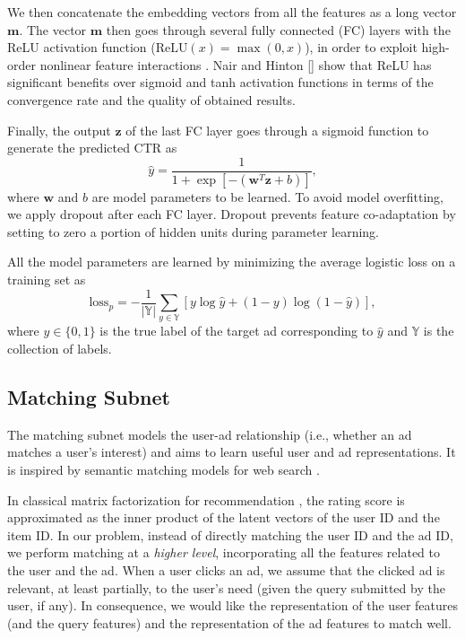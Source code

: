 \documentclass{article}
\begin{document}
We then concatenate the embedding vectors from all the features as a long vector $\mathbf{m}$.
The vector $\mathbf{m}$ then goes through several fully connected (FC) layers with the ReLU activation function ($\mathrm{ReLU}(x) = \max(0, x)$), in order to exploit high-order nonlinear feature interactions \cite{he2017neural}. Nair and Hinton [\citeyear{nair2010rectified}] show that ReLU has significant benefits over sigmoid and tanh activation functions in terms of the convergence rate and the quality of obtained results.

Finally, the output $\mathbf{z}$ of the last FC layer goes through a sigmoid function to generate the predicted CTR as
\[
\hat{y} = \frac{1}{1+\exp[- (\mathbf{w}^T \mathbf{z} + b)]},
\]
where $\mathbf{w}$ and $b$ are model parameters to be learned.
To avoid model overfitting, we apply dropout \cite{srivastava2014dropout} after each FC layer.
Dropout prevents feature co-adaptation by setting to zero a portion of hidden units during parameter learning.

All the model parameters are learned by minimizing the average logistic loss on a training set as
\begin{equation} \label{loss_p}
\mathrm{loss}_p = - \frac{1}{|\mathbb{Y}|}\sum_{y \in \mathbb{Y}} [y \log \hat{y} + (1 - y) \log (1 - \hat{y})],
\end{equation}
where $y \in\{0,1\}$ is the true label of the target ad corresponding to $\hat{y}$ and $\mathbb{Y}$ is the collection of labels.

\subsection{Matching Subnet}
The matching subnet models the user-ad relationship (i.e., whether an ad matches a user's interest) and aims to learn useful user and ad representations. It is inspired by semantic matching models for web search \cite{huang2013learning}.

In classical matrix factorization for recommendation \cite{koren2009matrix}, the rating score is approximated as the inner product of the latent vectors of the user ID and the item ID.
In our problem, instead of directly matching the user ID and the ad ID, we perform matching at a \emph{higher level}, incorporating all the features related to the user and the ad.
When a user clicks an ad, we assume that the clicked ad is relevant, at least partially, to the user's need (given the query submitted by the user, if any).
In consequence, we would like the representation of the user features (and the query features) and the representation of the ad features to match well.
\end{document}
